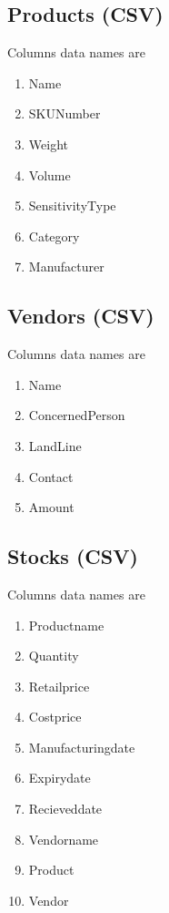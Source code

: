 \documentclass[12pt,a4paper]{article}
\begin{document}
\subsection{Products (CSV)}

Columns data names are
\begin{enumerate}
\item Name 			
\item SKUNumber 		
\item Weight 			
\item Volume 			
\item SensitivityType 
\item Category 		
\item Manufacturer	

\end{enumerate}

\subsection{Vendors (CSV)}

Columns data names are
\begin{enumerate}
\item Name  			
\item ConcernedPerson 	
\item LandLine			
\item Contact 			
\item Amount 

\end{enumerate}


\subsection{Stocks (CSV)}
Columns data names are
\begin{enumerate} 
\item Productname 		
\item 	Quantity 			
\item 	Retailprice 		
\item 	Costprice 			
\item  	Manufacturingdate 	
\item  	Expirydate 			
\item 	 Recieveddate 		
\item 	Vendorname 			
\item Product 				
\item Vendor 			

\end{enumerate}
\end{document}
